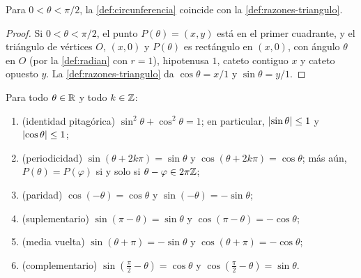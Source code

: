 \begin{proposicion}\label{prop:coherencia}
Para $0<\theta<\pi/2$, la \cref{def:circunferencia} coincide con la \cref{def:razones-triangulo}.
\end{proposicion}

\begin{proof}
Si $0<\theta<\pi/2$, el punto $P(\theta)=(x,y)$ está en el primer cuadrante, y el triángulo de vértices $O$, $(x,0)$ y $P(\theta)$ es rectángulo en $(x,0)$, con ángulo $\theta$ en $O$ (por la \cref{def:radian} con $r=1$), hipotenusa $1$, cateto contiguo $x$ y cateto opuesto $y$. La \cref{def:razones-triangulo} da $\cos\theta=x/1$ y $\sin\theta=y/1$.
\end{proof}

\begin{teorema}\label{teo:simetrias}
Para todo $\theta\in\mathbb{R}$ y todo $k\in\mathbb{Z}$:
\begin{enumerate}
  \item (identidad pitagórica) $\sin^{2}\theta+\cos^{2}\theta=1$; en particular, $\lvert\sin\theta\rvert\le 1$ y $\lvert\cos\theta\rvert\le 1$;
  \item (periodicidad) $\sin(\theta+2k\pi)=\sin\theta$ y $\cos(\theta+2k\pi)=\cos\theta$; más aún, $P(\theta)=P(\varphi)$ si y solo si $\theta-\varphi\in2\pi\mathbb{Z}$;
  \item (paridad) $\cos(-\theta)=\cos\theta$ y $\sin(-\theta)=-\sin\theta$;
  \item (suplementario) $\sin(\pi-\theta)=\sin\theta$ y $\cos(\pi-\theta)=-\cos\theta$;
  \item (media vuelta) $\sin(\theta+\pi)=-\sin\theta$ y $\cos(\theta+\pi)=-\cos\theta$;
  \item (complementario) $\sin(\tfrac{\pi}{2}-\theta)=\cos\theta$ y $\cos(\tfrac{\pi}{2}-\theta)=\sin\theta$.
\end{enumerate}
\end{teorema}

